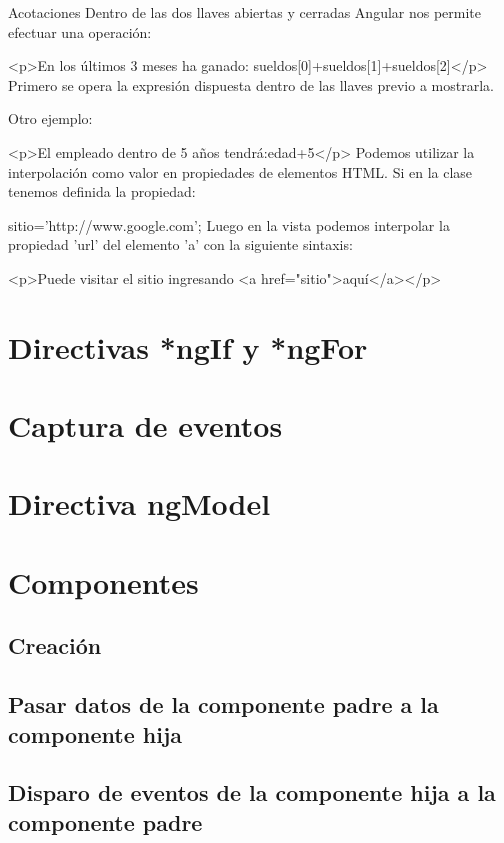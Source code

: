 \documentclass[12pt]{book} %
\begin{document}
Acotaciones
Dentro de las dos llaves abiertas y cerradas Angular nos permite efectuar una operación:

<p>En los últimos 3 meses ha ganado: {{sueldos[0]+sueldos[1]+sueldos[2]}}</p>  
Primero se opera la expresión dispuesta dentro de las llaves previo a mostrarla.

Otro ejemplo:

<p>El empleado dentro de 5 años tendrá:{{edad+5}}</p>
Podemos utilizar la interpolación como valor en propiedades de elementos HTML. Si en la clase tenemos definida la propiedad:

sitio='http://www.google.com';
Luego en la vista podemos interpolar la propiedad 'url' del elemento 'a' con la siguiente sintaxis:

<p>Puede visitar el sitio ingresando <a href="{{sitio}}">aquí</a></p>
\chapter{Directivas *ngIf y *ngFor}

\chapter{Captura de eventos}

\chapter{Directiva ngModel}

\chapter{Componentes}

\section{Creación}

\section[Pasar datos de la componente padre a la componente hija]{Pasar datos de la componente padre a la componente hija}

\section[Disparo de eventos de la componente hija a la componente padre]{Disparo de eventos de la componente hija a la componente padre}
\end{document}
